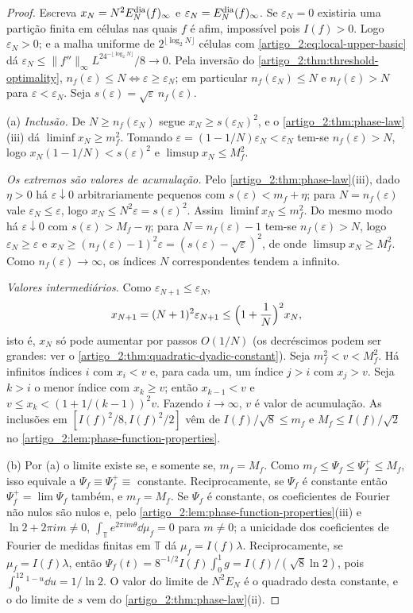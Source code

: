 \begin{proof}
Escreva $x_N=N^2E_N^{\rm dia}(f)_\infty$ e $\varepsilon_N=E_N^{\rm dia}(f)_\infty$.
Se $\varepsilon_N=0$ existiria uma partição finita em células nas quais $f$ é afim,
impossível pois $I(f)>0$. Logo $\varepsilon_N>0$; e a malha uniforme de $2^{\lfloor\log_2N\rfloor}$ células com
\eqref{artigo_2:eq:local-upper-basic} dá
$\varepsilon_N\le\|f''\|_\infty L^24^{-\lfloor\log_2N\rfloor}/8\to0$.
Pela inversão do \cref{artigo_2:thm:threshold-optimality},
$n_f(\varepsilon)\le N\iff\varepsilon\ge\varepsilon_N$; em particular
$n_f(\varepsilon_N)\le N$ e $n_f(\varepsilon)>N$ para $\varepsilon<\varepsilon_N$.
Seja $s(\varepsilon)=\sqrt\varepsilon\,n_f(\varepsilon)$.

(a) \emph{Inclusão.} De $N\ge n_f(\varepsilon_N)$ segue $x_N\ge s(\varepsilon_N)^2$, e
o \cref{artigo_2:thm:phase-law}(iii) dá $\liminf x_N\ge m_f^2$. Tomando
$\varepsilon=(1-1/N)\varepsilon_N<\varepsilon_N$ tem-se $n_f(\varepsilon)>N$, logo
$x_N(1-1/N)<s(\varepsilon)^2$ e $\limsup x_N\le M_f^2$.

\emph{Os extremos são valores de acumulação.} Pelo
\cref{artigo_2:thm:phase-law}(iii), dado $\eta>0$ há $\varepsilon\downarrow0$
arbitrariamente pequenos com $s(\varepsilon)<m_f+\eta$; para $N=n_f(\varepsilon)$ vale
$\varepsilon_N\le\varepsilon$, logo $x_N\le N^2\varepsilon=s(\varepsilon)^2$.
Assim $\liminf x_N\le m_f^2$. Do mesmo modo há $\varepsilon\downarrow0$ com
$s(\varepsilon)>M_f-\eta$; para $N=n_f(\varepsilon)-1$ tem-se $n_f(\varepsilon)>N$,
logo $\varepsilon_N\ge\varepsilon$ e $x_N\ge(n_f(\varepsilon)-1)^2\varepsilon=(s(\varepsilon)-\sqrt\varepsilon)^2$,
de onde $\limsup x_N\ge M_f^2$. Como $n_f(\varepsilon)\to\infty$, os índices $N$
correspondentes tendem a infinito.

\emph{Valores intermediários.} Como $\varepsilon_{N+1}\le\varepsilon_N$,
\[
 x_{N+1}=(N+1)^2\varepsilon_{N+1}\le\Bigl(1+\frac1N\Bigr)^2x_N,
\]
isto é, $x_N$ só pode aumentar por passos $O(1/N)$ (os decréscimos podem ser
grandes: ver o \cref{artigo_2:thm:quadratic-dyadic-constant}). Seja
$m_f^2<v<M_f^2$. Há infinitos índices $i$ com $x_i<v$ e, para cada um, um
índice $j>i$ com $x_j>v$. Seja $k>i$ o menor índice com $x_k\ge v$; então
$x_{k-1}<v$ e $v\le x_k<(1+1/(k-1))^2v$. Fazendo $i\to\infty$, $v$ é valor de
acumulação. As inclusões em $[I(f)^2/8,I(f)^2/2]$ vêm de
$I(f)/\sqrt8\le m_f$ e $M_f\le I(f)/\sqrt2$ no
\cref{artigo_2:lem:phase-function-properties}.

(b) Por (a) o limite existe se, e somente se, $m_f=M_f$. Como
$m_f\le\Psi_f\le\Psi_f^+\le M_f$, isso equivale a $\Psi_f\equiv\Psi_f^+\equiv$
constante. Reciprocamente, se $\Psi_f$ é constante então $\Psi_f^+=\lim\Psi_f$ também,
e $m_f=M_f$. Se $\Psi_f$ é constante, os coeficientes de Fourier não nulos
são nulos e, pelo \cref{artigo_2:lem:phase-function-properties}(iii) e
$\ln2+2\pi im\ne0$, $\int_{\mathbb T}e^{2\pi im\theta}\dd\mu_f=0$ para $m\ne0$; a
unicidade dos coeficientes de Fourier de medidas finitas em $\mathbb T$ dá
$\mu_f=I(f)\lambda$. Reciprocamente, se $\mu_f=I(f)\lambda$, então
$\Psi_f(t)=8^{-1/2}I(f)\int_0^1g=I(f)/(\sqrt8\ln2)$, pois
$\int_0^12^{1-u}\dd u=1/\ln2$. O valor do limite de $N^2E_N$ é o quadrado desta
constante, e o do limite de $s$ vem do \cref{artigo_2:thm:phase-law}(ii).


\end{proof}
